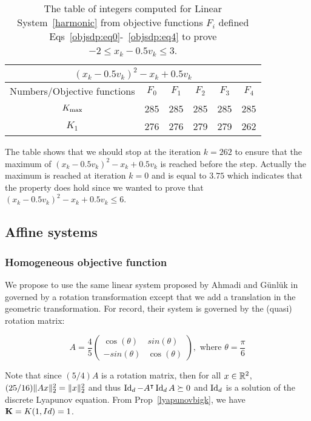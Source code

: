 \documentclass[10pt]{article}
\begin{document}
\begin{table}[h!]
\begin{center}
\begin{tabular}{|c|c|c|c|c|c|}
\hline
\multicolumn{6}{|c|}{$(x_k-0.5 v_k)^2-x_k+0.5 v_k$}\\
\hline
Numbers/Objective functions & $F_0$ & $F_{1}$ & $F_{2}$ & $F_3$ & $F_4$ \\
\hline
$K_{\rm max}$ & 285&285 &285 &285 &285 \\
\hline
 $K_{1}$ &276 &276 &279 &279 &262 \\
\hline
\end{tabular}
\end{center}
\caption{The table of integers computed for Linear System~\eqref{harmonic} from objective functions $F_i$ defined Eqs~\eqref{objsdp:eq0}-~\eqref{objsdp:eq4} to prove $-2\leq x_k-0.5v_k\leq 3$.}
\end{table}

The table shows that we should stop at the iteration $k=262$ to ensure that the maximum of $(x_k-0.5 v_k)^2-x_k+0.5 v_k$ is reached before the step. Actually the maximum is reached at iteration $k=0$ and is equal to $3.75$ which indicates that the property does hold since we wanted to prove that
$(x_k-0.5 v_k)^2-x_k+0.5 v_k\leq 6$. 
\subsection{Affine systems}

\subsubsection{Homogeneous objective function}

We propose to use the same linear system proposed by Ahmadi and G\"unl\"uk in~\cite{ahmadi2018robust} governed by a rotation transformation except that we add a translation in the geometric transformation. For record, their system is governed by the (quasi) rotation matrix:

\[
A=
 \dfrac{4}{5}\begin{pmatrix}
 \cos(\theta)& sin(\theta)\\
-sin(\theta) & \cos(\theta)
\end{pmatrix},\text{ where }\theta=\dfrac{\pi}{6}
\]

Note that since $(5/4)A$ is a rotation matrix, then for all $x\in\mathbb R^2$,
$(25/16)\| Ax\|_2^2=\| x\|_2^2$ and thus $\operatorname{Id}_d-A^\intercal \operatorname{Id}_d A\succeq 0$ and $\operatorname{Id}_d$ is a solution of the discrete Lyapunov equation. From Prop~\ref{lyapunovbigk}, we have $\mathbf{K}=K(1,Id)=1$. 
\end{document}
